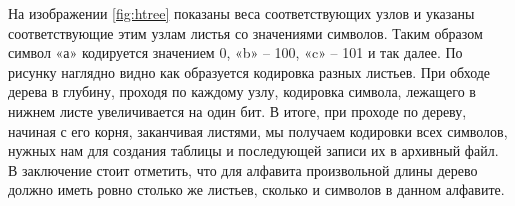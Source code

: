 На изображении \ref{fig:htree} показаны веса соответствующих узлов и указаны соответствующие этим узлам листья со значениями символов.
Таким образом символ «а» кодируется значением 0, «b» -- 100, «c» -- 101 и так далее. 
По рисунку наглядно видно как образуется кодировка разных листьев. 
При обходе дерева в глубину, проходя по каждому узлу, кодировка символа, лежащего в нижнем листе увеличивается на один бит.
В итоге, при проходе по дереву, начиная с его корня, заканчивая листями, мы получаем кодировки всех символов, нужных нам для создания таблицы и последующей записи их в архивный файл.
В заключение стоит отметить, что для алфавита произвольной длины дерево должно иметь ровно столько же листьев, сколько и символов в данном алфавите.